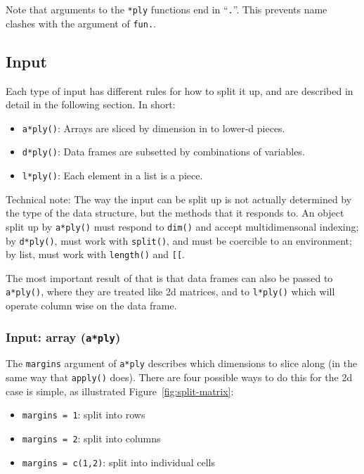 \documentclass{scrartcl}
\newcommand{\code}[1]{\lstinline!#1!}
\newcommand{\f}[1]{\lstinline!#1()!}
\begin{document}
Note that arguments to the {\tt **ply} functions end in  ``\code{.}''. This prevents name clashes with the argument of \code{fun.}.  

\subsection{Input} 
\label{sec:input}

Each type of input has different rules for how to split it up, and are described in detail in the following section. In short:

\begin{itemize}
  \item \f{a*ply}: Arrays are sliced by dimension in to lower-d pieces.
  \item \f{d*ply}: Data frames are subsetted by combinations of variables.
  \item \f{l*ply}: Each element in a list is a piece.
\end{itemize}

Technical note: The way the input can be split up is not actually determined by the type of the data structure, but the methods that it responds to.  An object split up by \f{a*ply} must respond to \f{dim} and accept multidimensonal indexing; by \f{d*ply}, must work with \f{split}, and must be coercible to an environment; by list, must work with \f{length} and \code{[[}.

The most important result of that is that data frames can also be passed to \f{a*ply}, where they are treated like 2d matrices, and to \f{l*ply} which will operate column wise on the data frame.

\subsubsection{Input: array ({\tt a*ply})}

The {\tt margins} argument of {\tt a*ply} describes which dimensions to slice along (in the same way that \f{apply} does).  There are four possible ways to do this for the 2d case is simple, as illustrated Figure~\ref{fig:split-matrix}:

\begin{itemize}
  \item \code{margins = 1}: split into rows
  \item \code{margins = 2}: split into columns
  \item \code{margins = c(1,2)}: split into individual cells
\end{itemize}
\end{document}
